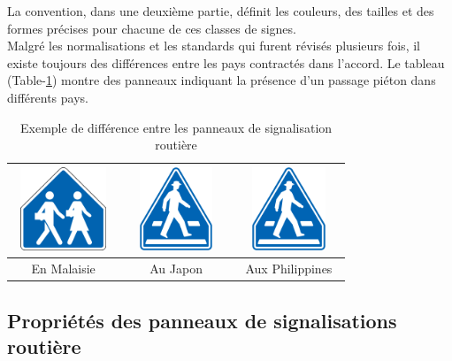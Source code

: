 \newpage
La convention, dans une deuxième partie, définit les couleurs, des tailles et des formes précises pour chacune de ces classes de signes.\\
Malgré les normalisations et les standards qui furent révisés plusieurs fois, il existe toujours des différences entre les pays contractés dans l’accord. Le tableau (Table-\ref{table:diff-p}) montre des panneaux indiquant la présence d'un passage piéton dans différents pays.\\
\begin{table}[]
\centering
\begin{tabular}{|l|l|l|}
\hline
\multicolumn{1}{|c|}{\includegraphics[width=3cm,height=2.5cm]{images/pieton5.png}} & \multicolumn{1}{c|}{\includegraphics[width=3cm,height=2.5cm]{images/pieton3.png}} & \multicolumn{1}{c|}{\includegraphics[width=3cm,height=2.5cm]{images/pieton3.png}} \\ \hline
\multicolumn{1}{|c|}{En Malaisie}    & \multicolumn{1}{c|}{Au Japon }  & \multicolumn{1}{c|}{Aux Philippines}\\ \hline
\end{tabular}
\caption{Exemple de différence entre les panneaux de         signalisation routière}
\label{table:diff-p}
\end{table}
\subsection{Propriétés des panneaux de signalisations routière}

